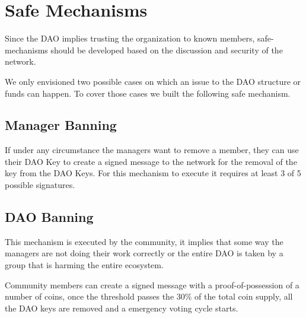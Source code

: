\documentclass{article}
\begin{document}
\section{Safe Mechanisms}

Since the DAO implies trusting the organization to known members, safe-mechanisms should be developed based on the discussion and security of the network.

We only envisioned two possible cases on which an issue to the DAO structure or funds can happen. To cover those cases we built the following safe mechanism.

\subsection{Manager Banning}

If under any circumstance the managers want to remove a member, they can use their DAO Key to create a signed message to the network for the removal of the key from the DAO Keys. For this mechanism to execute it requires at least 3 of 5 possible signatures.

\subsection{DAO Banning}

This mechanism is executed by the community, it implies that some way the managers are not doing their work correctly or the entire DAO is taken by a group that is harming the entire ecosystem.

Community members can create a signed message with a proof-of-possession of a number of coins, once the threshold passes the 30\% of the total coin supply, all the DAO keys are removed and a emergency voting cycle starts.
\end{document}
